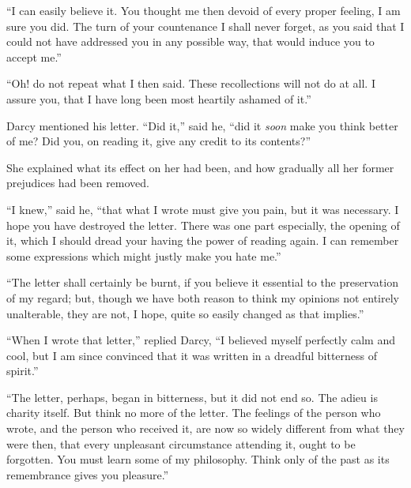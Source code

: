 “I can easily believe it. You thought me then devoid
of every proper feeling, I am sure you did. The turn of
your countenance I shall never forget, as you said that
I could not have addressed you in any possible way, that
would induce you to accept me.”

“Oh! do not repeat what I then said. These recollections
will not do at all. I assure you, that I have long
been most heartily ashamed of it.”

Darcy mentioned his letter. “Did it,” said he, “did
it \textit{soon} make you think better of me? Did you, on reading
it, give any credit to its contents?”

She explained what its effect on her had been, and how
gradually all her former prejudices had been removed.

“I knew,” said he, “that what I wrote must give you
pain, but it was necessary. I hope you have destroyed
the letter. There was one part especially, the opening
of it, which I should dread your having the power of
reading again. I can remember some expressions which
might justly make you hate me.”

“The letter shall certainly be burnt, if you believe it
essential to the preservation of my regard; but, though
we have both reason to think my opinions not entirely
unalterable, they are not, I hope, quite so easily changed
as that implies.”

“When I wrote that letter,” replied Darcy, “I believed
myself perfectly calm and cool, but I am since convinced
that it was written in a dreadful bitterness of spirit.”

“The letter, perhaps, began in bitterness, but it did
not end so. The adieu is charity itself. But think no
more of the letter. The feelings of the person who wrote,
and the person who received it, are now so widely different
from what they were then, that every unpleasant circumstance
attending it, ought to be forgotten. You must
learn some of my philosophy. Think only of the past as
its remembrance gives you pleasure.”

